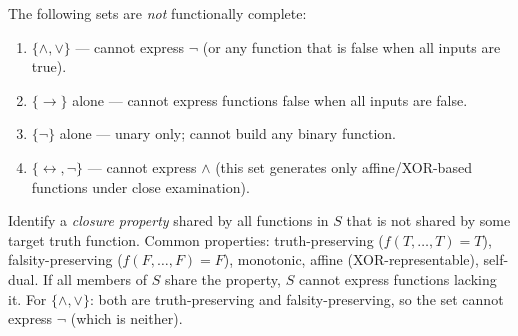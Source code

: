 \begin{tcolorbox}[colback=thmbox, colframe=thmborder, arc=2pt,
  left=6pt, right=6pt, top=4pt, bottom=4pt,
  title={\small\textbf{Theorem (Non-Adequate Sets)}},
  fonttitle=\small\bfseries]
\label{thm:non-adequate}
The following sets are \emph{not} functionally complete:
\begin{enumerate}
  \item $\{\wedge, \vee\}$ — cannot express $\neg$ (or any function that
        is false when all inputs are true).
  \item $\{\rightarrow\}$ alone — cannot express functions false when all
        inputs are false.
  \item $\{\neg\}$ alone — unary only; cannot build any binary function.
  \item $\{\leftrightarrow, \neg\}$ — cannot express $\wedge$ (this set
        generates only affine/XOR-based functions under close examination).
\end{enumerate}
\end{tcolorbox}

\begin{remark}
Identify a \emph{closure property} shared by all functions in $S$ that is not
shared by some target truth function. Common properties:
truth-preserving ($f(T,\ldots,T)=T$), falsity-preserving ($f(F,\ldots,F)=F$),
monotonic, affine (XOR-representable), self-dual.
If all members of $S$ share the property, $S$ cannot express functions lacking it.
For $\{\wedge,\vee\}$: both are truth-preserving and falsity-preserving, so the
set cannot express $\neg$ (which is neither).
\end{remark}

